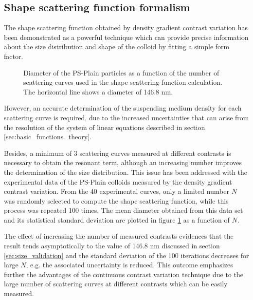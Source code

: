 \subsection{Shape scattering function formalism}
The shape scattering function obtained by density gradient contrast variation has been demonstrated as a powerful technique which can provide precise information about the size distribution and shape of the colloid by fitting a simple form factor.

\begin{figure}
	\begin{center}
		
	\end{center}
\caption[Diameter of the PS-Plain particles obtained from the shape scattering function as a function of the number of scattering curves.]{Diameter of the PS-Plain particles as a function of the number of scattering curves used in the shape scattering function calculation. The horizontal line shows a diameter of 146.8 nm.}
\label{fig:ResonantTermSimulationNumber}
\end{figure}

However, an accurate determination of the suspending medium density for each scattering curve is required, due to the increased uncertainties \citep{lefebvre_propagation_2000} that can arise from the resolution of the system of linear equations described in section \ref{sec:basic_functions_theory}.

Besides, a minimum of 3 scattering curves measured at different contrasts is necessary to obtain the resonant term, although an increasing number improves the determination of the size distribution. This issue has been addressed with the experimental data of the PS-Plain colloids measured by the density gradient contrast variation. From the 40 experimental curves, only a limited number $N$ was randomly selected to compute the shape scattering function, while this process was repeated 100 times. The mean diameter obtained from this data set and its statistical standard deviation are plotted in figure \ref{fig:ResonantTermSimulationNumber} as a function of $N$.

The effect of increasing the number of measured contrasts evidences that the result tends asymptotically to the value of 146.8 nm discussed in section \ref{sec:size_validation} and the standard deviation of the 100 iterations decreases for large $N$, e.g. the associated uncertainty is reduced. This outcome emphasizes further the advantages of the continuous contrast variation technique due to the large number of scattering curves at different contrasts which can be easily measured.

